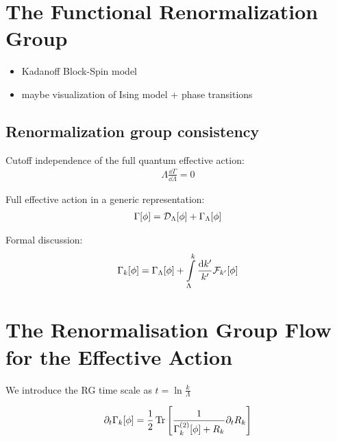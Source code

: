 \section{The Functional Renormalization Group}
\begin{itemize}
	\item Kadanoff Block-Spin model 
	\item maybe visualization of Ising model + phase transitions
\end{itemize}

\subsection{Renormalization group consistency}
Cutoff independence of the full quantum effective action:
\begin{align}
	\Lambda\frac{\dd\Gamma}{\dd\Lambda} = 0
\end{align}

Full effective action in a generic representation:
\begin{align}
	\Gamma[\phi] = \mathcal{D}_{\Lambda}[\phi] + \Gamma_{\Lambda}[\phi]
\end{align}

Formal discussion:
\begin{align}
\Gamma_{k}[\phi] = \Gamma_{\Lambda}[\phi] + \int\limits_{\Lambda}^k \frac{\dd k'}{k'} \mathcal{F}_{k'}[\phi]
\end{align}
 
 
\section{The Renormalisation Group Flow  for the Effective Action}
We introduce the RG time scale as $t = \ln \frac{k}{\Lambda}$

\begin{align}
	\partial_t\Gamma_{k}[\phi] = \frac{1}{2}\operatorname{Tr}\left[ \frac{1}{\Gamma_{k}^{(2)}[\phi] + R_k} \partial_t R_k \right]
\end{align}
